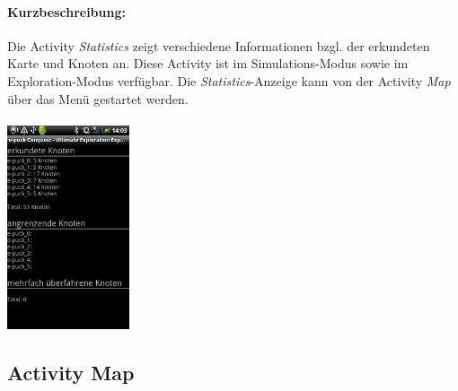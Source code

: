 \documentclass[10pt,a4paper]{article}
\begin{document}
 		\paragraph*{Kurzbeschreibung:}
 		Die Activity \textit{Statistics} zeigt verschiedene Informationen bzgl. der erkundeten Karte und Knoten an. Diese Activity ist im Simulations-Modus sowie im
 		Exploration-Modus verf\"ugbar. Die \textit{Statistics}-Anzeige kann von der Activity \textit{Map} \"uber das Men\"u gestartet werden. \\ \\
 		\includegraphics[height=6cm]{images/statistic.png}
 	\subsection{Activity Map}
\end{document}
